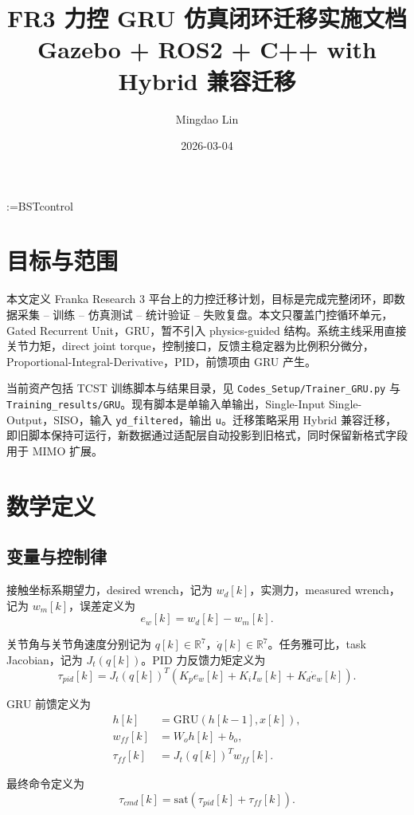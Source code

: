 \documentclass[11pt,a4paper]{article}
\title{FR3 力控 GRU 仿真闭环迁移实施文档\\
\large Gazebo + ROS2 + C++ with Hybrid 兼容迁移}
\author{Mingdao Lin}
\date{2026-03-04}
\makeatletter
\providecommand{\bstctlcite}[1]{%
  \@bsphack
  \@for\@citeb:=#1\do{%
    \edef\@citeb{\expandafter\@firstofone\@citeb}%
    \if@filesw\immediate\write\@auxout{\string\citation{\@citeb}}\fi
  }%
  \@esphack
}
\makeatother
\begin{document}
\maketitle
\bstctlcite{BSTcontrol}

\section{目标与范围}
本文定义 Franka Research 3 平台上的力控迁移计划，目标是完成完整闭环，即数据采集 -- 训练 -- 仿真测试 -- 统计验证 -- 失败复盘。本文只覆盖门控循环单元，Gated Recurrent Unit，GRU，暂不引入 physics-guided 结构。系统主线采用直接关节力矩，direct joint torque，控制接口，反馈主稳定器为比例积分微分，Proportional-Integral-Derivative，PID，前馈项由 GRU 产生。

当前资产包括 TCST 训练脚本与结果目录，见 \texttt{Codes\_Setup/Trainer\_GRU.py} 与 \texttt{Training\_results/GRU}。现有脚本是单输入单输出，Single-Input Single-Output，SISO，输入 \texttt{yd\_filtered}，输出 \texttt{u}。迁移策略采用 Hybrid 兼容迁移，即旧脚本保持可运行，新数据通过适配层自动投影到旧格式，同时保留新格式字段用于 MIMO 扩展。

\section{数学定义}
\subsection{变量与控制律}
接触坐标系期望力，desired wrench，记为 $w_d[k]$，实测力，measured wrench，记为 $w_m[k]$，误差定义为
\begin{equation}
  e_w[k] = w_d[k] - w_m[k].
\end{equation}

关节角与关节角速度分别记为 $q[k] \in \mathbb{R}^7$，$\dot q[k] \in \mathbb{R}^7$。任务雅可比，task Jacobian，记为 $J_t(q[k])$。PID 力反馈力矩定义为
\begin{equation}
  \tau_{pid}[k] = J_t(q[k])^T \left(K_p e_w[k] + K_i I_w[k] + K_d \dot e_w[k]\right).
\end{equation}

GRU 前馈定义为
\begin{align}
  h[k] &= \mathrm{GRU}\left(h[k-1], x[k]\right), \\
  w_{ff}[k] &= W_o h[k] + b_o, \\
  \tau_{ff}[k] &= J_t(q[k])^T w_{ff}[k].
\end{align}

最终命令定义为
\begin{equation}
  \tau_{cmd}[k] = \mathrm{sat}\left(\tau_{pid}[k] + \tau_{ff}[k]\right).
\end{equation}
\end{document}
